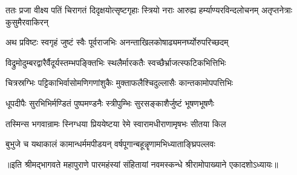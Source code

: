 \fourlineindentedshloka
{ततः प्रजा वीक्ष्य पतिं चिरागतं}
{दिदृक्षयोत्सृष्टगृहाः स्त्रियो नराः}
{आरुह्य हर्म्याण्यरविन्दलोचनम्}
{अतृप्तनेत्राः कुसुमैरवाकिरन्} %

\twolineshloka
{अथ प्रविष्टः स्वगृहं जुष्टं स्वैः पूर्वराजभिः}
{अनन्ताखिलकोषाढ्यमनर्घ्योरुपरिच्छदम्} %

\twolineshloka
{विद्रुमोदुम्बरद्वारैर्वैदूर्यस्तम्भपङ्क्तिभिः}
{स्थलैर्मारकतैः स्वच्छैर्भ्राजत्स्फटिकभित्तिभिः} %

\twolineshloka
{चित्रस्रग्भिः पट्टिकाभिर्वासोमणिगणांशुकैः}
{मुक्ताफलैश्चिदुल्लासैः कान्तकामोपपत्तिभिः} %

\twolineshloka
{धूपदीपैः सुरभिभिर्मण्डितं पुष्पमण्डनैः}
{स्त्रीपुम्भिः सुरसङ्काशैर्जुष्टं भूषणभूषणैः} %

\twolineshloka
{तस्मिन्स भगवान्रामः स्निग्धया प्रिययेष्टया}
{रेमे स्वारामधीराणामृषभः सीतया किल} %

\twolineshloka
{बुभुजे च यथाकालं कामान्धर्ममपीडयन्}
{वर्षपूगान्बहून्नॄणामभिध्याताङ्घ्रिपल्लवः} %


॥इति श्रीमद्भागवते महापुराणे पारमहंस्यां संहितायां नवमस्कन्धे श्रीरामोपाख्याने एकादशोऽध्यायः॥


\closesection